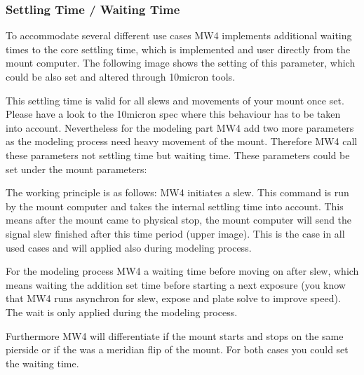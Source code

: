 \documentclass[a4paper,10pt,english]{sphinxmanual}
\begin{document}
\subsubsection{Settling Time / Waiting Time}
\label{\detokenize{config/mount/settlingTime:settling-time-waiting-time}}\label{\detokenize{config/mount/settlingTime::doc}}
\sphinxAtStartPar
To accommodate several different use cases MW4 implements additional waiting
times to the core settling time, which is implemented and user directly from the
mount computer. The following image shows the setting of this parameter, which
could be also set and altered through 10micron tools.


\sphinxAtStartPar
This settling time is valid for all slews and movements of your mount once set.
Please have a look to the 10micron spec where this behaviour has to be taken into
account. Nevertheless for the modeling part MW4 add two more parameters as the
modeling process need heavy movement of the mount. Therefore MW4 call these
parameters not settling time but waiting time. These parameters could be set
under the mount parameters:


\sphinxAtStartPar
The working principle is as follows: MW4 initiates a slew. This command is run by
the mount computer and takes the internal settling time into account. This means
after the mount came to physical stop, the mount computer will send the signal
slew finished after this time period (upper image). This is the case in all used
cases and will applied also during modeling process.

\sphinxAtStartPar
For the modeling process MW4  a waiting time before moving on after slew,
which means waiting the addition set time before starting a next exposure (you
know that MW4 runs asynchron for slew, expose and plate solve to improve speed).
The wait is only applied during the modeling process.

\sphinxAtStartPar
Furthermore MW4 will differentiate if the mount starts and stops on the same
pierside or if the was a meridian flip of the mount. For both cases you could set
the waiting time.
\end{document}

